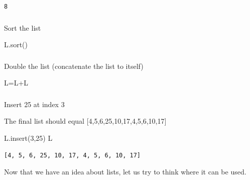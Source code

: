 \documentclass[
  letterpaper,
  DIV=11,
  numbers=noendperiod]{scrreprt}
\newenvironment{Shaded}{\begin{snugshade}}{\end{snugshade}}
\newcommand{\DecValTok}[1]{\textcolor[rgb]{0.68,0.00,0.00}{#1}}
\newcommand{\NormalTok}[1]{\textcolor[rgb]{0.00,0.23,0.31}{#1}}
\newcommand{\OperatorTok}[1]{\textcolor[rgb]{0.37,0.37,0.37}{#1}}
\begin{document}
\begin{verbatim}
8
\end{verbatim}

\hypertarget{section-10}{%
\subsubsection{}\label{section-10}}

Sort the list

\begin{Shaded}
\begin{Highlighting}[]
\NormalTok{L.sort()}
\end{Highlighting}
\end{Shaded}

\hypertarget{section-11}{%
\subsubsection{}\label{section-11}}

Double the list (concatenate the list to itself)

\begin{Shaded}
\begin{Highlighting}[]
\NormalTok{L}\OperatorTok{=}\NormalTok{L}\OperatorTok{+}\NormalTok{L}
\end{Highlighting}
\end{Shaded}

\hypertarget{section-12}{%
\subsubsection{}\label{section-12}}

Insert 25 at index 3

The final list should equal {[}4,5,6,25,10,17,4,5,6,10,17{]}

\begin{Shaded}
\begin{Highlighting}[]
\NormalTok{L.insert(}\DecValTok{3}\NormalTok{,}\DecValTok{25}\NormalTok{)}
\NormalTok{L}
\end{Highlighting}
\end{Shaded}

\begin{verbatim}
[4, 5, 6, 25, 10, 17, 4, 5, 6, 10, 17]
\end{verbatim}

Now that we have an idea about lists, let us try to think where it can
be used.

\begin{verbatim}
\end{verbatim}
\end{document}
